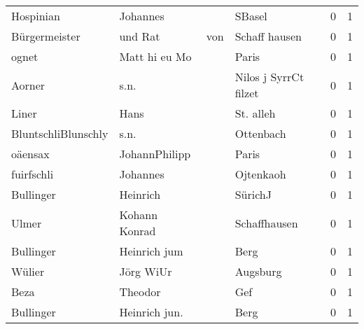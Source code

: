 \begin{tabular}{llllrr}
                Hospinian &                           Johannes &             &                                      SBasel &          0 &         1 \\
            Bürgermeister &                            und Rat &         von &                               Schaff hausen &          0 &         1 \\
                    ognet &                      Matt hi eu Mo &             &                                       Paris &          0 &         1 \\
                   Aorner &                               s.n. &             &                       Nilos j SyrrCt filzet &          0 &         1 \\
                    Liner &                               Hans &             &                                   St. alleh &          0 &         1 \\
      BluntschliBlunschly &                               s.n. &             &                                   Ottenbach &          0 &         1 \\
                  oäensax &                      JohannPhilipp &             &                                       Paris &          0 &         1 \\
               fuirfschli &                           Johannes &             &                                   Ojtenkaoh &          0 &         1 \\
                Bullinger &                           Heinrich &             &                                     SürichJ &          0 &         1 \\
                    Ulmer &                      Kohann Konrad &             &                                Schaffhausen &          0 &         1 \\
                Bullinger &                       Heinrich jum &             &                                        Berg &          0 &         1 \\
                   Wülier &                          Jörg WiUr &             &                                    Augsburg &          0 &         1 \\
                     Beza &                            Theodor &             &                                         Gef &          0 &         1 \\
                Bullinger &                      Heinrich jun. &             &                                        Berg &          0 &         1 \\

\end{tabular}
